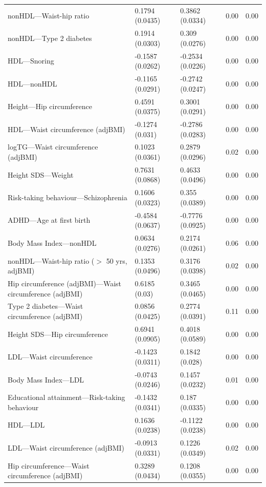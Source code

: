 \begin{table}[ht]
\begin{tabular}{lllrr}
  nonHDL---Waist-hip ratio & 0.1794 (0.0435) & 0.3862 (0.0334) & 0.00 & 0.00 \\ 
  nonHDL---Type 2 diabetes & 0.1914 (0.0303) & 0.309 (0.0276) & 0.00 & 0.00 \\ 
  HDL---Snoring & -0.1587 (0.0262) & -0.2534 (0.0226) & 0.00 & 0.00 \\ 
  HDL---nonHDL & -0.1165 (0.0291) & -0.2742 (0.0247) & 0.00 & 0.00 \\ 
  Height---Hip circumference & 0.4591 (0.0375) & 0.3001 (0.0291) & 0.00 & 0.00 \\ 
  HDL---Waist circumference (adjBMI) & -0.1274 (0.031) & -0.2786 (0.0283) & 0.00 & 0.00 \\ 
  logTG---Waist circumference (adjBMI) & 0.1023 (0.0361) & 0.2879 (0.0296) & 0.02 & 0.00 \\ 
  Height SDS---Weight & 0.7631 (0.0868) & 0.4633 (0.0496) & 0.00 & 0.00 \\ 
  Risk-taking behaviour---Schizophrenia & 0.1606 (0.0323) & 0.355 (0.0389) & 0.00 & 0.00 \\ 
  ADHD---Age at first birth & -0.4584 (0.0637) & -0.7776 (0.0925) & 0.00 & 0.00 \\ 
  Body Mass Index---nonHDL & 0.0634 (0.0276) & 0.2174 (0.0261) & 0.06 & 0.00 \\ 
  nonHDL---Waist-hip ratio ($>$ 50 yrs, adjBMI) & 0.1353 (0.0496) & 0.3176 (0.0398) & 0.02 & 0.00 \\ 
  Hip circumference (adjBMI)---Waist circumference (adjBMI) & 0.6185 (0.03) & 0.3465 (0.0465) & 0.00 & 0.00 \\ 
  Type 2 diabetes---Waist circumference (adjBMI) & 0.0856 (0.0425) & 0.2774 (0.0391) & 0.11 & 0.00 \\ 
  Height SDS---Hip circumference & 0.6941 (0.0905) & 0.4018 (0.0589) & 0.00 & 0.00 \\ 
  LDL---Waist circumference & -0.1423 (0.0311) & 0.1842 (0.028) & 0.00 & 0.00 \\ 
  Body Mass Index---LDL & -0.0743 (0.0246) & 0.1457 (0.0232) & 0.01 & 0.00 \\ 
  Educational attainment---Risk-taking behaviour & -0.1432 (0.0341) & 0.187 (0.0335) & 0.00 & 0.00 \\ 
  HDL---LDL & 0.1636 (0.0238) & -0.1122 (0.0238) & 0.00 & 0.00 \\ 
  LDL---Waist circumference (adjBMI) & -0.0913 (0.0331) & 0.1226 (0.0349) & 0.02 & 0.00 \\ 
  Hip circumference---Waist circumference (adjBMI) & 0.3289 (0.0434) & 0.1208 (0.0355) & 0.00 & 0.00 \\ 

\end{tabular}
\end{table}
